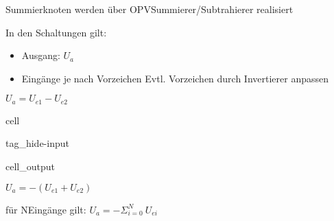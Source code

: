\documentclass[letterpaper,10pt,english]{jupyterBook}
\begin{document}
\begin{DUlineblock}{0em}
\item[] 
\end{DUlineblock}

\sphinxAtStartPar
Summierknoten werden über OPV\sphinxhyphen{}Summierer/Subtrahierer realisiert

\sphinxAtStartPar
In den Schaltungen gilt:
\begin{itemize}
\item {} 
\sphinxAtStartPar
Ausgang: \(U_a\)

\item {} 
\sphinxAtStartPar
Eingänge je nach Vorzeichen
Evtl. Vorzeichen durch Invertierer anpassen

\end{itemize}

\begin{DUlineblock}{0em}
\item[] 
\end{DUlineblock}

\sphinxAtStartPar
\(U_a = U_{e1} - U_{e2}\)

\begin{sphinxuseclass}{cell}
\begin{sphinxuseclass}{tag_hide-input}\begin{sphinxVerbatimOutput}

\begin{sphinxuseclass}{cell_output}
\noindent{}

\end{sphinxuseclass}\end{sphinxVerbatimOutput}

\end{sphinxuseclass}
\end{sphinxuseclass}
\begin{DUlineblock}{0em}
\item[] 
\end{DUlineblock}

\sphinxAtStartPar
\(U_a = -(U_{e1} + U_{e2})\)

\sphinxAtStartPar
für N\sphinxhyphen{}Eingänge gilt:
\(U_a = - \Sigma_{i=0}^{N}~U_{ei}\)
\end{document}
